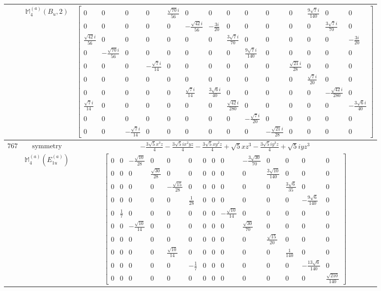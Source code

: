 \documentclass[fleqn,8pt,landscape]{jsarticle}
\begin{document}
\begin{longtable}{ccc}
$  $ & $ \mathbb{M}_{4}^{(a)}(B_{u},2) $ & $ \begin{bmatrix} 0 & 0 & 0 & 0 & \frac{\sqrt{70} i}{56} & 0 & 0 & 0 & 0 & 0 & 0 & \frac{9 \sqrt{7} i}{140} & 0 & 0 \\ 0 & 0 & 0 & 0 & 0 & - \frac{\sqrt{42} i}{56} & - \frac{3 i}{20} & 0 & 0 & 0 & 0 & 0 & \frac{3 \sqrt{7} i}{70} & 0 \\ \frac{\sqrt{42} i}{56} & 0 & 0 & 0 & 0 & 0 & 0 & \frac{3 \sqrt{7} i}{70} & 0 & 0 & 0 & 0 & 0 & - \frac{3 i}{20} \\ 0 & - \frac{\sqrt{70} i}{56} & 0 & 0 & 0 & 0 & 0 & 0 & \frac{9 \sqrt{7} i}{140} & 0 & 0 & 0 & 0 & 0 \\ 0 & 0 & 0 & - \frac{\sqrt{7} i}{14} & 0 & 0 & 0 & 0 & 0 & 0 & \frac{\sqrt{21} i}{28} & 0 & 0 & 0 \\ 0 & 0 & 0 & 0 & 0 & 0 & 0 & 0 & 0 & 0 & 0 & \frac{\sqrt{7} i}{20} & 0 & 0 \\ 0 & 0 & 0 & 0 & 0 & \frac{\sqrt{7} i}{14} & \frac{3 \sqrt{6} i}{40} & 0 & 0 & 0 & 0 & 0 & - \frac{\sqrt{42} i}{280} & 0 \\ \frac{\sqrt{7} i}{14} & 0 & 0 & 0 & 0 & 0 & 0 & \frac{\sqrt{42} i}{280} & 0 & 0 & 0 & 0 & 0 & - \frac{3 \sqrt{6} i}{40} \\ 0 & 0 & 0 & 0 & 0 & 0 & 0 & 0 & - \frac{\sqrt{7} i}{20} & 0 & 0 & 0 & 0 & 0 \\ 0 & 0 & - \frac{\sqrt{7} i}{14} & 0 & 0 & 0 & 0 & 0 & 0 & - \frac{\sqrt{21} i}{28} & 0 & 0 & 0 & 0 \end{bmatrix} $ \\ \hline
$ 767 $ & $ \text{symmetry} $ & $ - \frac{3 \sqrt{5} x^{3} z}{4} - \frac{3 \sqrt{5} i x^{2} y z}{4} - \frac{3 \sqrt{5} x y^{2} z}{4} + \sqrt{5} x z^{3} - \frac{3 \sqrt{5} i y^{3} z}{4} + \sqrt{5} i y z^{3} $ \\
$  $ & $ \mathbb{M}_{4}^{(a)}(E_{1u}^{(a)}) $ & $ \begin{bmatrix} 0 & 0 & - \frac{\sqrt{10}}{28} & 0 & 0 & 0 & 0 & 0 & 0 & - \frac{3 \sqrt{30}}{70} & 0 & 0 & 0 & 0 \\ 0 & 0 & 0 & \frac{\sqrt{30}}{28} & 0 & 0 & 0 & 0 & 0 & 0 & \frac{3 \sqrt{10}}{140} & 0 & 0 & 0 \\ 0 & 0 & 0 & 0 & - \frac{\sqrt{15}}{28} & 0 & 0 & 0 & 0 & 0 & 0 & \frac{3 \sqrt{6}}{35} & 0 & 0 \\ 0 & 0 & 0 & 0 & 0 & \frac{1}{28} & 0 & 0 & 0 & 0 & 0 & 0 & - \frac{9 \sqrt{6}}{140} & 0 \\ 0 & \frac{1}{7} & 0 & 0 & 0 & 0 & 0 & 0 & - \frac{\sqrt{10}}{14} & 0 & 0 & 0 & 0 & 0 \\ 0 & 0 & - \frac{\sqrt{10}}{14} & 0 & 0 & 0 & 0 & 0 & 0 & \frac{\sqrt{30}}{70} & 0 & 0 & 0 & 0 \\ 0 & 0 & 0 & 0 & 0 & 0 & 0 & 0 & 0 & 0 & \frac{\sqrt{15}}{20} & 0 & 0 & 0 \\ 0 & 0 & 0 & 0 & \frac{\sqrt{10}}{14} & 0 & 0 & 0 & 0 & 0 & 0 & \frac{1}{140} & 0 & 0 \\ 0 & 0 & 0 & 0 & 0 & - \frac{1}{7} & 0 & 0 & 0 & 0 & 0 & 0 & - \frac{13 \sqrt{6}}{140} & 0 \\ 0 & 0 & 0 & 0 & 0 & 0 & 0 & 0 & 0 & 0 & 0 & 0 & 0 & \frac{\sqrt{210}}{140} \end{bmatrix} $ \\ \hline

\end{longtable}
\end{document}
